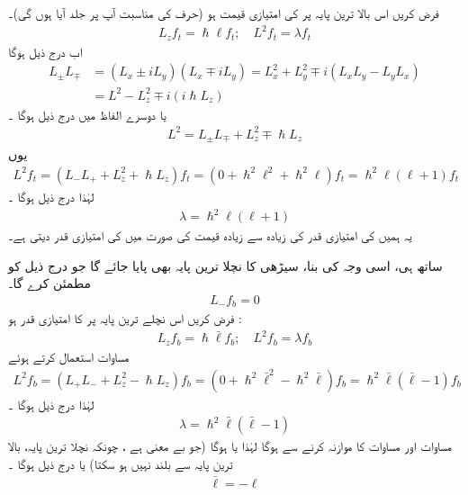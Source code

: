 فرض کریں اس بالا ترین  پایہ پر  کی امتیازی قیمت  ہو (حرف  کی مناسبت آپ پر جلد آیا ہوں گی)۔ 
\begin{align}
L_z f_t = \hslash \ell f_{t}; \quad L^2 f_t = \lambda f_t
\end{align}
اب درج ذیل ہوگا 
\begin{align*} 
L_{\pm} L_{\mp}&= (L_x \pm i L_y) (L_x \mp i L_y) = L_x^2 + L_y^2 \mp i (L_x L_y - L_y L_x) \\
&= L^2 - L_z^2 \mp i (i \hslash L_z)
\end{align*}
یا دوسرے الفاظ میں درج ذیل ہوگا ۔
\begin{align}\label{مساوات_تین_ابعادی_مربع_بصورت_رفعت}
L^2 = L_{\pm} L_{\mp} + L_z^2 \mp \hslash L_z
\end{align}
یوں 
\begin{align*}
L^2 f_t = (L_{-} L_{+} + L_z^2 + \hslash L_z) f_t = (0 + \hslash^2 \ell^2 + \hslash^2 \ell) f_t = \hslash^2 \ell (\ell + 1) f_t
\end{align*}
لہٰذا درج ذیل ہوگا ۔
\begin{align}\label{مساوات_تین_ابعادی_لمڈا_تعلق_الف}
\lambda = \hslash^2 \ell (\ell + 1)
\end{align}
یہ ہمیں  کی امتیازی قدر کی زیادہ سے زیادہ قیمت کی صورت میں  کی امتیازی قدر دیتی ہے۔

 ساتھ ہی،  اسی وجہ کی بنا،  سیڑھی کا  نچلا ترین  پایہ  بھی پایا جائے گا جو درج ذیل کو مطمئن کرے گا۔ 
\begin{align}
L_{-} f_b = 0
\end{align}
فرض کریں اس نچلے ترین  پایہ پر  کا امتیازی قدر  ہو :
\begin{align}
L_z f_b = \hslash \bar{\ell} f_b ; \quad L^2 f_b = \lambda f_b
\end{align}
مساوات  استعمال کرتے ہوئے
\begin{align*}
L^2 f_b = (L_{+} L_{-} + L_z^2 - \hslash L_z ) f_b = (0 + \hslash^2 \bar{\ell}^{2} - \hslash^2 \bar{\ell}) f_b = \hslash^2 \bar{\ell} (\bar{\ell} - 1) f_b
\end{align*}
لہٰذا درج ذیل ہوگا ۔
\begin{align}\label{مساوات_تین_ابعادی_لمڈا_تعلق_ب}
\lambda = \hslash^2 \bar{\ell} (\bar{\ell} - 1)
\end{align}
مساوات    اور مساوات  کا موازنہ کرنے سے  ہوگا لہٰذا یا  ہوگا   (جو بے معنی ہے ، چونکہ نچلا ترین  پایہ، بالا ترین   پایہ سے  بلند نہیں ہو سکتا)  یا درج ذیل ہوگا ۔
\begin{align}
\bar{\ell} = - \ell
\end{align}

